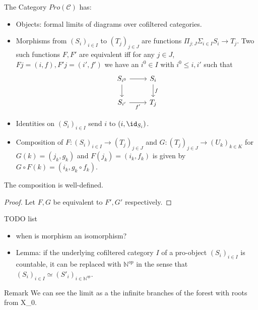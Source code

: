 \begin{definition}
  The Category $Pro(\mathcal C)$ has: 
  \begin{itemize}
    \item Objects: formal limits of diagrams over cofiltered categories. 
    \item Morphisms from $(S_i)_{i\in I}$ to $(T_j)_{j\in J}$ 
      are functions $\Pi_{j:J} \Sigma_{i \in I} S_i \to T_j$. 
      Two such functions $F,F'$ are equivalent iff 
      for any $j\in J$, $Fj = (i, f), F'j = (i',f')$
      we have an $i^0\in I$ with $i^0 \leq i, i'$
      such that
      \begin{equation}\begin{tikzcd}
        S_{i^0} \arrow[r] \arrow[d] & S_{i} \arrow[d,"f"]\\
        S_{i'} \arrow[r,"f'"'] & T_j
      \end{tikzcd}\end{equation}  
    \item Identities on $(S_i)_{i\in I}$ send $i$ to $(i,\id_{S_i})$. 
    \item Composition of 
      $F: (S_i)_{i \in I} \to (T_j)_{j\in J}$  and 
      $G: (T_j)_{j \in J} \to (U_k)_{k\in K}$
      for $G(k) = (j_k,g_k)$ and $F(j_k) = (i_k, f_k)$
      is given by $G\circ F (k) = (i_k , g_k \circ f_k)$.
  \end{itemize} 
\end{definition} 
\begin{lemma}
  The composition is well-defined. 
\end{lemma}
\begin{proof}
  Let $F,G$ be equivalent to $F', G'$ respectively. 
\end{proof}

TODO list
\begin{itemize}
  \item when is morphism an isomorphism? 
  \item Lemma: if the underlying cofiltered category $I$ of a pro-object $(S_i)_{i\in I}$ is countable, it can be replaced with $\mathbb N^{op}$
    in the sense that $(S_i)_{i\in I} \simeq (S'_i)_{i\in\mathbb N^{op}}$. 
\end{itemize}  


Remark We can see the limit as a the infinite branches of the forest with roots from X_0. 
